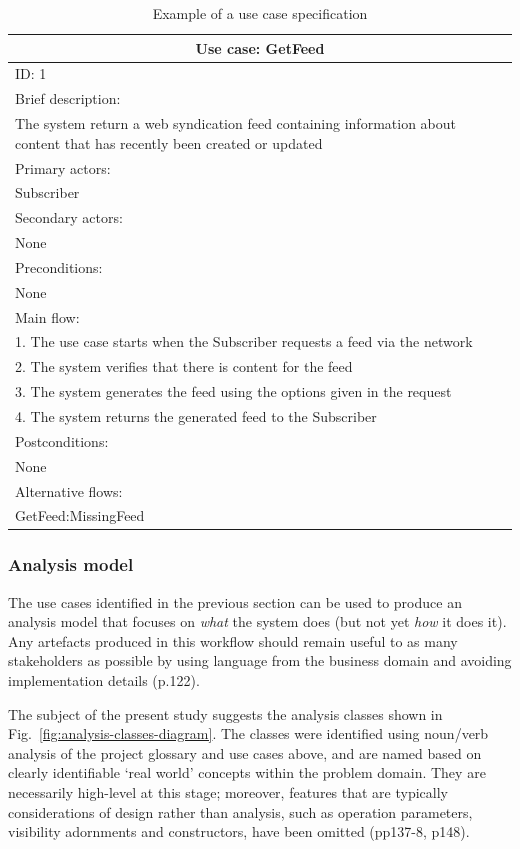 \documentclass[runningheads,a4paper]{llncs}
\begin{document}
\begin{table}[t]
\begin{center}
\begin{tabular}{ | p{\textwidth} |}
\hline
\multicolumn{1}{|c|}{Use case: GetFeed} \\
\hline
ID: 1 \\
\hline
Brief description: \\
The system return a web syndication feed containing information about content that has recently been created or updated \\
\hline
Primary actors: \\
Subscriber \\
\hline
Secondary actors: \\
None \\
\hline
Preconditions: \\
None \\
\hline
Main flow: \\
1. The use case starts when the Subscriber requests a feed via the network \\
2. The system verifies that there is content for the feed \\
3. The system generates the feed using the options given in the request \\
4. The system returns the generated feed to the Subscriber \\
\hline
Postconditions: \\
None \\
\hline
Alternative flows: \\
GetFeed:MissingFeed \\
\hline
\end{tabular}
\end{center}
\caption{Example of a use case specification}
\label{tab:use-case-detail}
\end{table}


\subsubsection{Analysis model}

The use cases identified in the previous section can be used to produce an analysis model that focuses on \textit{what} the system does (but not yet \textit{how} it does it). Any artefacts produced in this workflow should remain useful to as many stakeholders as possible by using language from the business domain and avoiding implementation details \cite{arlow} (p.122).

The subject of the present study suggests the analysis classes shown in Fig.~\ref{fig:analysis-classes-diagram}. The classes were identified using noun/verb analysis of the project glossary and use cases above, and are named based on clearly identifiable `real world' concepts within the problem domain. They are necessarily high-level at this stage; moreover, features that are typically considerations of design rather than analysis, such as operation parameters, visibility adornments and constructors, have been omitted \cite{arlow} (pp137-8, p148).
\end{document}
